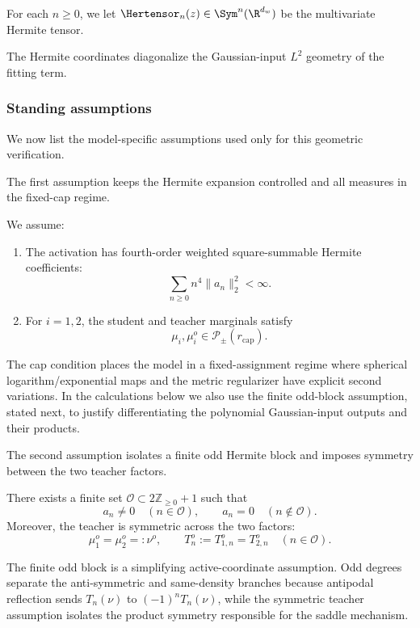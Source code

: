 For each $n\ge 0$, we let $\Hertensor_n(z)\in \Sym^n(\R^{d_w})$ be the multivariate Hermite tensor.

The Hermite coordinates diagonalize the Gaussian-input \(L^2\) geometry of the fitting term.

\subsubsection{Standing assumptions}
\label{subsubsection:spherical-model-assumptions}

We now list the model-specific assumptions used only for this geometric verification.

The first assumption keeps the Hermite expansion controlled and all measures in the fixed-cap regime. 
\begin{assumption}
\label{assumption:on-sphere}
We assume:
\begin{enumerate}
    \item The activation has fourth-order weighted square-summable Hermite coefficients:
    \[
        \sum_{n\ge0} n^4\|a_n\|_2^2<\infty.
    \]
    \item For \(i=1,2\), the student and teacher marginals satisfy
    \[
        \mu_i,\mu_i^o\in\mathcal P_\pm(r_{\mathrm{cap}}).
    \]
\end{enumerate}
\end{assumption}
The cap condition places the model in a fixed-assignment regime where
spherical logarithm/exponential maps and the metric regularizer have
explicit second variations.  In the calculations below we also use the
finite odd-block assumption, stated next, to justify differentiating the
polynomial Gaussian-input outputs and their products.

The second assumption isolates a finite odd Hermite block and imposes symmetry between the two teacher factors.
\begin{assumption}
\label{assumption:odd-symmetric-teacher}
There exists a finite set \(\mathcal O\subset 2\mathbb Z_{\ge0}+1\) such that
\[
    a_n\neq0 \quad (n\in\mathcal O),
    \qquad
    a_n=0 \quad (n\notin\mathcal O).
\]
Moreover, the teacher is symmetric across the two factors:
\[
    \mu_1^o=\mu_2^o=:\nu^o,
    \qquad
    T_n^o:=T_{1,n}^o=T_{2,n}^o
    \quad(n\in\mathcal O).
\]
\end{assumption}
The finite odd block is a simplifying active-coordinate assumption.  Odd degrees
separate the anti-symmetric and same-density branches because antipodal
reflection sends \(T_n(\nu)\) to \((-1)^nT_n(\nu)\), while the symmetric teacher
assumption isolates the product symmetry responsible for the saddle mechanism.

